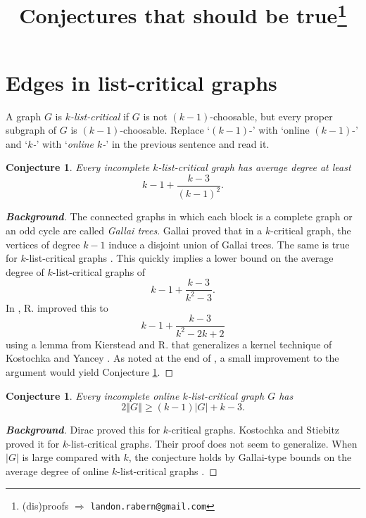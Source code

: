 \documentclass[12pt]{article}
\title{Conjectures that should be true\thanks{(dis)proofs $\Rightarrow$ \texttt{landon.rabern@gmail.com}}}
\theoremstyle{plain}
\newtheorem{conjecture}[thm]{Conjecture}
\theoremstyle{definition}
\theoremstyle{remark}
\newcommand{\card}[1]{\left|#1\right|}
\newcommand{\size}[1]{\left\Vert#1\right\Vert}
\begin{document}
\maketitle

\section{Edges in list-critical graphs}
A graph $G$ is \emph{$k$-list-critical} if $G$ is not $(k-1)$-choosable, but every
proper subgraph of $G$ is $(k-1)$-choosable.  Replace `$(k-1)$-' with `online $(k-1)$-' and `\emph{$k$-}' with `\emph{online $k$-}' in the previous sentence and read it.

\begin{conjecture}\label{C1}
Every incomplete $k$-list-critical graph has average degree at least \[k-1 + \frac{k-3}{(k-1)^2}.\]
\end{conjecture}
\begin{proof}[\textbf{Background}]
The connected graphs in which each block is a complete graph or an odd cycle are called \emph{Gallai trees}.  Gallai \cite{gallai1963kritische} proved that in a $k$-critical graph, 
the vertices of degree $k-1$ induce a disjoint union of Gallai trees.  The same is true for $k$-list-critical graphs \cite{borodin1977criterion, erdos1979choosability}. 
This quickly implies a lower bound on the average degree of $k$-list-critical graphs of \[k-1 + \frac{k-3}{k^2-3}.\]
In \cite{rabern2016better}, R. improved this to \[k-1 + \frac{k-3}{k^2-2k+2}\] using a lemma from Kierstead and R. \cite{KernelMagic} that generalizes a kernel technique of Kostochka and Yancey \cite{kostochkayancey2012ore}.
As noted at the end of \cite{rabern2016better}, a small improvement to the argument would yield Conjecture \ref{C1}.  
\end{proof}

\begin{conjecture}
Every incomplete online $k$-list-critical graph $G$ has \[2\size{G} \ge (k-1)\card{G} + k-3.\]
\end{conjecture}\label{C2}
\begin{proof}[\textbf{Background}]
Dirac \cite{dirac1957theorem} proved this for $k$-critical graphs.  Kostochka and Stiebitz \cite{kostochka2002list} proved it for $k$-list-critical graphs.  Their proof does not seem to generalize.
When $\card{G}$ is large compared with $k$, the conjecture holds by Gallai-type bounds on the average degree of online $k$-list-critical graphs \cite{OreVizing,DischargingLowerBound}.
\end{proof}
\end{document}
